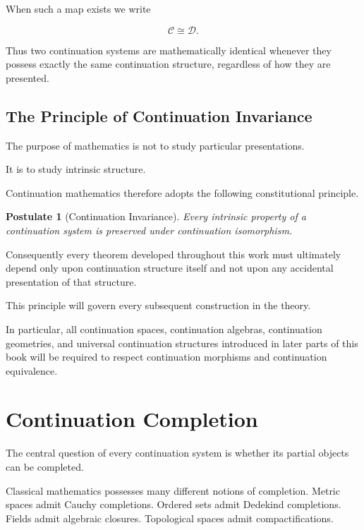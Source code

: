 \documentclass[13pt,openany]{book}
\theoremstyle{plain}
\newtheorem{postulate}{Postulate}[chapter]
\theoremstyle{definition}
\begin{document}
When such a map exists we write

\[
\mathcal C
\cong
\mathcal D.
\]

Thus two continuation systems are mathematically identical whenever they
possess exactly the same continuation structure, regardless of how they are
presented.


\section{The Principle of Continuation Invariance}

The purpose of mathematics is not to study particular presentations.

It is to study intrinsic structure.

Continuation mathematics therefore adopts the following constitutional
principle.

\begin{postulate}[Continuation Invariance]

Every intrinsic property of a continuation system is preserved under
continuation isomorphism.

\end{postulate}

Consequently every theorem developed throughout this work must ultimately
depend only upon continuation structure itself and not upon any accidental
presentation of that structure.

This principle will govern every subsequent construction in the theory.

In particular, all continuation spaces, continuation algebras, continuation
geometries, and universal continuation structures introduced in later parts of
this book will be required to respect continuation morphisms and continuation
equivalence.


\chapter{Continuation Completion}

The central question of every continuation system is whether its partial objects
can be completed.

Classical mathematics possesses many different notions of completion.
Metric spaces admit Cauchy completions.
Ordered sets admit Dedekind completions.
Fields admit algebraic closures.
Topological spaces admit compactifications.
\end{document}
